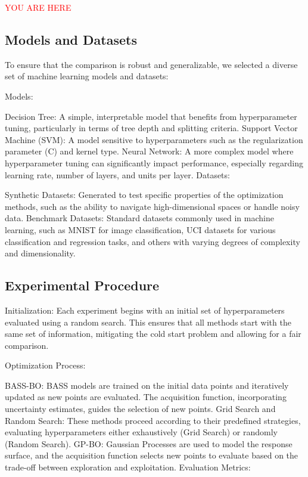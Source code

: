 \textcolor{red}{YOU ARE HERE}

\subsection{Models and Datasets}

To ensure that the comparison is robust and generalizable, we selected a diverse set of machine learning models and datasets:

Models:

Decision Tree: A simple, interpretable model that benefits from hyperparameter tuning, particularly in terms of tree depth and splitting criteria.
Support Vector Machine (SVM): A model sensitive to hyperparameters such as the regularization parameter (C) and kernel type.
Neural Network: A more complex model where hyperparameter tuning can significantly impact performance, especially regarding learning rate, number of layers, and units per layer.
Datasets:

Synthetic Datasets: Generated to test specific properties of the optimization methods, such as the ability to navigate high-dimensional spaces or handle noisy data.
Benchmark Datasets: Standard datasets commonly used in machine learning, such as MNIST for image classification, UCI datasets for various classification and regression tasks, and others with varying degrees of complexity and dimensionality.
\subsection{Experimental Procedure}

Initialization: Each experiment begins with an initial set of hyperparameters evaluated using a random search. This ensures that all methods start with the same set of information, mitigating the cold start problem and allowing for a fair comparison.

Optimization Process:

BASS-BO: BASS models are trained on the initial data points and iteratively updated as new points are evaluated. The acquisition function, incorporating uncertainty estimates, guides the selection of new points.
Grid Search and Random Search: These methods proceed according to their predefined strategies, evaluating hyperparameters either exhaustively (Grid Search) or randomly (Random Search).
GP-BO: Gaussian Processes are used to model the response surface, and the acquisition function selects new points to evaluate based on the trade-off between exploration and exploitation.
Evaluation Metrics:

